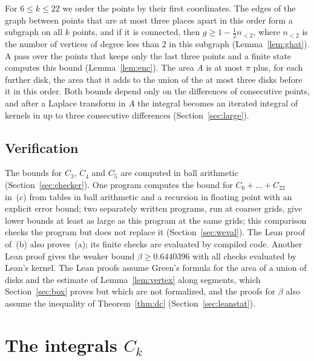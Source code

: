 \documentclass[11pt]{amsart}
\theoremstyle{definition}
\theoremstyle{remark}
\numberwithin{equation}{section}
\newcommand{\KmaxW}{22}
\newcommand{\LeanKbound}{0.6440396}%
\newcommand{\Kmax}{\KmaxW}
\begin{document}
For $6\le k\le\Kmax$ we order the points by their first coordinates. The edges of the graph between points that are at most three places apart in this order form a subgraph on all $k$ points, and if it is connected, then $g\ge1-\frac12n_{<2}$, where $n_{<2}$ is the number of vertices of degree less than $2$ in this subgraph (Lemma~\ref{lem:ghat}). A pass over the points that keeps only the last three points and a finite state computes this bound (Lemma~\ref{lem:enc}). The area $A$ is at most $\pi$ plus, for each further disk, the area that it adds to the union of the at most three disks before it in this order. Both bounds depend only on the differences of consecutive points, and after a Laplace transform in $A$ the integral becomes an iterated integral of kernels in up to three consecutive differences (Section~\ref{sec:large}).


\subsection*{Verification}
The bounds for $C_3$, $C_4$ and $C_5$ are computed in ball arithmetic (Section~\ref{sec:checker}). One program computes the bound for $C_6+\dots+C_{\Kmax}$ in~(c) from tables in ball arithmetic and a recursion in floating point with an explicit error bound; two separately written programs, run at coarser grids, give lower bounds at least as large as this program at the same grids; this comparison checks the program but does not replace it (Section~\ref{sec:weval}). The Lean proof of~(b) also proves~(a); its finite checks are evaluated by compiled code. Another Lean proof gives the weaker bound $\beta\ge\LeanKbound$ with all checks evaluated by Lean's kernel. The Lean proofs assume Green's formula for the area of a union of disks and the estimate of Lemma~\ref{lem:vertex} along segments, which Section~\ref{sec:box} proves but which are not formalized, and the proofs for $\beta$ also assume the inequality of Theorem~\ref{thm:dc} (Section~\ref{sec:leanstat}).


\section{The integrals \texorpdfstring{$C_k$}{C\_k}}\label{sec:integrals}
\end{document}
